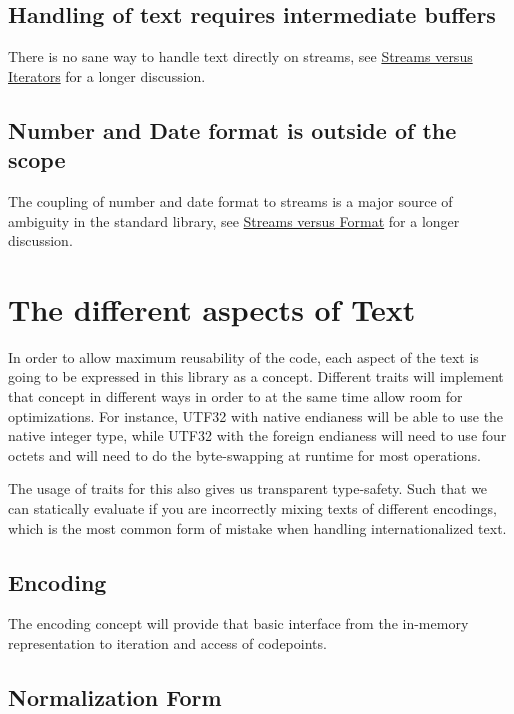 \subsection*{Handling of text requires intermediate buffers}

There is no sane way to handle text directly on streams, see \hyperlink{md__home_ruoso_devel_u5e_StreamVsIterators}{Streams versus Iterators} for a longer discussion.

\subsection*{Number and Date format is outside of the scope}

The coupling of number and date format to streams is a major source of ambiguity in the standard library, see \hyperlink{md__home_ruoso_devel_u5e_StreamVsFormat}{Streams versus Format} for a longer discussion.

\section*{The different aspects of Text}

In order to allow maximum reusability of the code, each aspect of the text is going to be expressed in this library as a concept. Different traits will implement that concept in different ways in order to at the same time allow room for optimizations. For instance, U\+T\+F32 with native endianess will be able to use the native integer type, while U\+T\+F32 with the foreign endianess will need to use four octets and will need to do the byte-\/swapping at runtime for most operations.

The usage of traits for this also gives us transparent type-\/safety. Such that we can statically evaluate if you are incorrectly mixing texts of different encodings, which is the most common form of mistake when handling internationalized text.

\subsection*{Encoding}

The encoding concept will provide that basic interface from the in-\/memory representation to iteration and access of codepoints.

\subsection*{Normalization Form}

